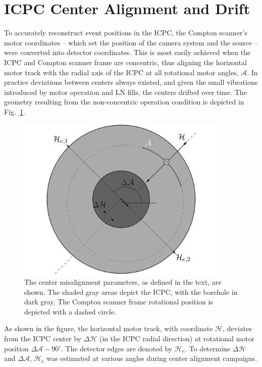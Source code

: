 \section{ICPC Center Alignment and Drift}\label{sec:centeralignment}
To accurately reconstruct event positions in the ICPC, the Compton scanner's motor coordinates -- which set the position of the camera system and the \CsS{} source --  were converted into detector coordinates. This is most easily achieved when the ICPC and Compton scanner frame are concentric, thus aligning the horizontal motor track with the radial axis of the ICPC at all rotational motor angles, $\mathcal{A}$. In practice deviations between centers always existed, and given the small vibrations introduced by motor operation and LN fills, the centers drifted over time. The geometry resulting from the non-concentric operation condition is depicted in Fig.~\ref{fig:misalignment}.
\begin{figure}[htb]
    \centering
    \includegraphics[width=4in]{figs/integration/icpc_alignment_quantities_labeled_width_4in.png}
    \caption{The center misalignment parameters, as defined in the text, are shown. The shaded gray areas depict the ICPC, with the borehole in dark gray. The Compton scanner frame rotational position is depicted with a dashed circle.}
    \label{fig:misalignment}
\end{figure}

As shown in the figure, the horizontal motor track, with coordinate $\mathcal{H}$, deviates from the ICPC center by $\Delta \mathcal{H}$ (in the ICPC radial direction) at rotational motor position $\Delta \mathcal{A} - 90^\circ$. The detector edges are denoted by $\mathcal{H}_e$. To determine $\Delta \mathcal{H}$ and $\Delta \mathcal{A}$, $\mathcal{H}_e$ was estimated at various angles during center alignment campaigns.

